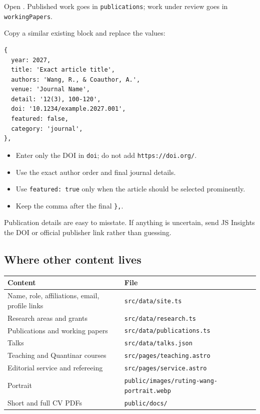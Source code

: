 \documentclass[10pt,a4paper]{article}
\newcommand{\pathlabel}[1]{\tcbox[on line,colback=PaleBlue,colframe=RuleGrey,boxrule=0.4pt,arc=1mm,left=1.6mm,right=1.6mm,top=0.5mm,bottom=0.5mm]{\ttfamily\scriptsize #1}}
\begin{document}
Open \pathlabel{src/data/publications.ts}. Published work goes in \texttt{publications}; work under review goes in \texttt{workingPapers}.

Copy a similar existing block and replace the values:

\begin{lstlisting}
{
  year: 2027,
  title: 'Exact article title',
  authors: 'Wang, R., & Coauthor, A.',
  venue: 'Journal Name',
  detail: '12(3), 100-120',
  doi: '10.1234/example.2027.001',
  featured: false,
  category: 'journal',
},
\end{lstlisting}

\begin{itemize}
  \item Enter only the DOI in \texttt{doi}; do not add \texttt{https://doi.org/}.
  \item Use the exact author order and final journal details.
  \item Use \texttt{featured: true} only when the article should be selected prominently.
  \item Keep the comma after the final \texttt{\},}.
\end{itemize}

\begin{tcolorbox}[alert]
Publication details are easy to misstate. If anything is uncertain, send JS Insights the DOI or official publisher link rather than guessing.
\end{tcolorbox}

\subsection{Where other content lives}

\begin{tabularx}{\linewidth}{Y L{72mm}}
\toprule
\textbf{Content} & \textbf{File}\\
\midrule
Name, role, affiliations, email, profile links & \texttt{src/data/site.ts}\\
Research areas and grants & \texttt{src/data/research.ts}\\
Publications and working papers & \texttt{src/data/publications.ts}\\
Talks & \texttt{src/data/talks.json}\\
Teaching and Quantinar courses & \texttt{src/pages/teaching.astro}\\
Editorial service and refereeing & \texttt{src/pages/service.astro}\\
Portrait & \texttt{public/images/ruting-wang-portrait.webp}\\
Short and full CV PDFs & \texttt{public/docs/}\\
\bottomrule
\end{tabularx}
\end{document}
